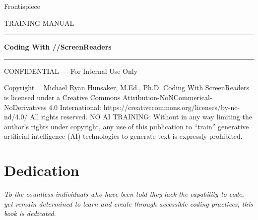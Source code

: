 \documentclass[
  justified,
  openright,
]{tufte-book}
\begin{document}
\frontmatter
\pagestyle{fancy}

\thispagestyle{empty}
\null
\clearpage

\thispagestyle{empty}
\begin{center}
  \vspace*{0.35\textheight}
  {\sffamily\large Frontispiece}
\end{center}
\clearpage

\begin{titlepage}
    \vspace*{1.6in}
    {\sffamily\fontsize{9}{11}\selectfont\MakeUppercase{Training Manual}}
    \vspace{0.3in}
    {\color{BrandAccent}\rule{4.5in}{2pt}}
    \vspace{0.25in}
    {\sffamily\bfseries\fontsize{32}{38}\selectfont Coding With //ScreenReaders}
    \vspace{0.2in}
    {\color{BrandAccent}\rule{4.5in}{0.6pt}}
    \vspace{0.5in}
    \vfill
    {\sffamily\fontsize{7.5}{9}\selectfont\color{MidGray}%
      CONFIDENTIAL --- For Internal Use Only%
    }
  \clearpage
  \nopagecolor
\end{titlepage}

\thispagestyle{empty}
\vspace*{0.25\textheight}
{\small
\noindent Copyright \textcopyright\ \the\year\ Michael Ryan Hunsaker, M.Ed., Ph.D. Coding With ScreenReaders is licensed under a Creative Commons Attribution-NoNCommerical-NoDerivatives 4.0 International: https://creativecommons.org/licenses/by-nc-nd/4.0/
\noindent All rights reserved.
\noindent NO AI TRAINING: Without in any way limiting the author's rights under copyright, any use of this publication to “train” generative artificial intelligence (AI) technologies to generate text is expressly prohibited.
}
\clearpage

{
\hypersetup{linkcolor=BrandBlue}
\tableofcontents
\clearpage
}

\chapter*{Dedication}
\thispagestyle{empty}
\begin{center}
  \vspace*{0.3\textheight}
  {\itshape To the countless individuals who have been told they lack the capability to code, yet remain determined to learn and create through accessible coding practices, this book is dedicated.}\\[1em]
\end{center}
\clearpage
\end{document}
